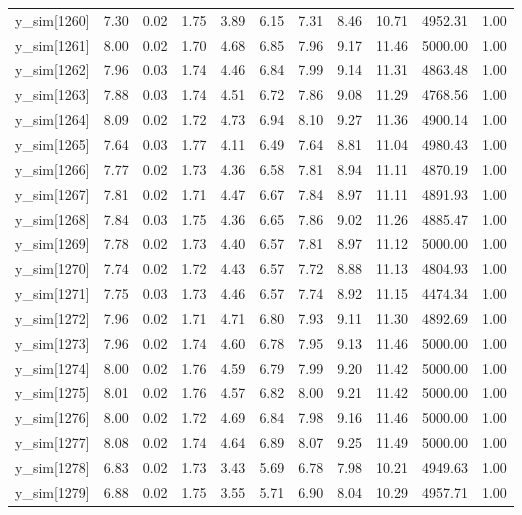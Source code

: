 \begin{table}[ht]
\begin{tabular}{rrrrrrrrrrr}
  y\_sim[1260] & 7.30 & 0.02 & 1.75 & 3.89 & 6.15 & 7.31 & 8.46 & 10.71 & 4952.31 & 1.00 \\ 
  y\_sim[1261] & 8.00 & 0.02 & 1.70 & 4.68 & 6.85 & 7.96 & 9.17 & 11.46 & 5000.00 & 1.00 \\ 
  y\_sim[1262] & 7.96 & 0.03 & 1.74 & 4.46 & 6.84 & 7.99 & 9.14 & 11.31 & 4863.48 & 1.00 \\ 
  y\_sim[1263] & 7.88 & 0.03 & 1.74 & 4.51 & 6.72 & 7.86 & 9.08 & 11.29 & 4768.56 & 1.00 \\ 
  y\_sim[1264] & 8.09 & 0.02 & 1.72 & 4.73 & 6.94 & 8.10 & 9.27 & 11.36 & 4900.14 & 1.00 \\ 
  y\_sim[1265] & 7.64 & 0.03 & 1.77 & 4.11 & 6.49 & 7.64 & 8.81 & 11.04 & 4980.43 & 1.00 \\ 
  y\_sim[1266] & 7.77 & 0.02 & 1.73 & 4.36 & 6.58 & 7.81 & 8.94 & 11.11 & 4870.19 & 1.00 \\ 
  y\_sim[1267] & 7.81 & 0.02 & 1.71 & 4.47 & 6.67 & 7.84 & 8.97 & 11.11 & 4891.93 & 1.00 \\ 
  y\_sim[1268] & 7.84 & 0.03 & 1.75 & 4.36 & 6.65 & 7.86 & 9.02 & 11.26 & 4885.47 & 1.00 \\ 
  y\_sim[1269] & 7.78 & 0.02 & 1.73 & 4.40 & 6.57 & 7.81 & 8.97 & 11.12 & 5000.00 & 1.00 \\ 
  y\_sim[1270] & 7.74 & 0.02 & 1.72 & 4.43 & 6.57 & 7.72 & 8.88 & 11.13 & 4804.93 & 1.00 \\ 
  y\_sim[1271] & 7.75 & 0.03 & 1.73 & 4.46 & 6.57 & 7.74 & 8.92 & 11.15 & 4474.34 & 1.00 \\ 
  y\_sim[1272] & 7.96 & 0.02 & 1.71 & 4.71 & 6.80 & 7.93 & 9.11 & 11.30 & 4892.69 & 1.00 \\ 
  y\_sim[1273] & 7.96 & 0.02 & 1.74 & 4.60 & 6.78 & 7.95 & 9.13 & 11.46 & 5000.00 & 1.00 \\ 
  y\_sim[1274] & 8.00 & 0.02 & 1.76 & 4.59 & 6.79 & 7.99 & 9.20 & 11.42 & 5000.00 & 1.00 \\ 
  y\_sim[1275] & 8.01 & 0.02 & 1.76 & 4.57 & 6.82 & 8.00 & 9.21 & 11.42 & 5000.00 & 1.00 \\ 
  y\_sim[1276] & 8.00 & 0.02 & 1.72 & 4.69 & 6.84 & 7.98 & 9.16 & 11.46 & 5000.00 & 1.00 \\ 
  y\_sim[1277] & 8.08 & 0.02 & 1.74 & 4.64 & 6.89 & 8.07 & 9.25 & 11.49 & 5000.00 & 1.00 \\ 
  y\_sim[1278] & 6.83 & 0.02 & 1.73 & 3.43 & 5.69 & 6.78 & 7.98 & 10.21 & 4949.63 & 1.00 \\ 
  y\_sim[1279] & 6.88 & 0.02 & 1.75 & 3.55 & 5.71 & 6.90 & 8.04 & 10.29 & 4957.71 & 1.00 \\ 

\end{tabular}
\end{table}
